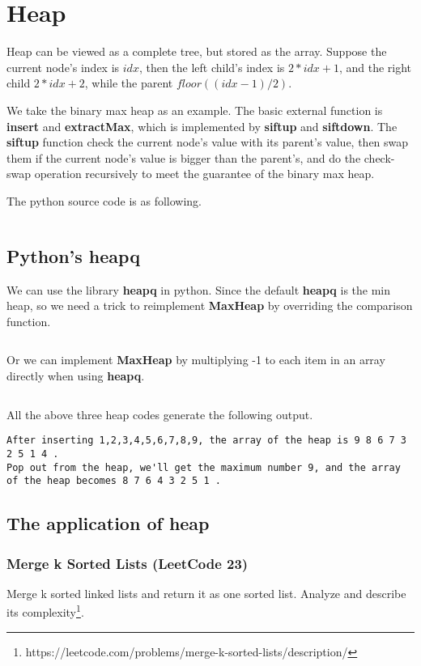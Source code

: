 \documentclass[11pt]{article}
\begin{document}
\inputminted{python}{src/maxSlidingWindow.py}

\section{Heap}
Heap can be viewed as a complete tree, but stored as the array. 
Suppose the current node's index is $idx$, then the left child's index is $2*idx+1$, and the right child $2*idx+2$, while the parent $floor((idx-1)/2)$.

We take the binary max heap as an example. 
The basic external function is \textbf{insert} and \textbf{extractMax}, which is implemented by \textbf{siftup} and \textbf{siftdown}. 
The \textbf{siftup} function check the current node's value with its parent's value, then swap them if the current node's value is bigger than the parent's, and do the check-swap operation recursively to meet the guarantee 
	of the binary max heap.
	
The python source code is as following.
\inputminted[breaklines=true,frame=leftline, linenos=true]{python}{src/heap.py}

\subsection{Python's heapq}
We can use the library \textbf{heapq} in python. 
Since the default \textbf{heapq} is the min heap, so we need a trick to reimplement \textbf{MaxHeap} by overriding the comparison function. 
\inputminted[breaklines=true,frame=leftline, linenos=true]{python}{src/heap_heapq.py}

Or we can implement \textbf{MaxHeap} by multiplying -1 to each item in an array directly when using \textbf{heapq}.

\inputminted[breaklines=true,frame=leftline, linenos=true]{python}{src/heap_heapq2.py}

All the above three heap codes generate the following output. 
\begin{verbatim}
After inserting 1,2,3,4,5,6,7,8,9, the array of the heap is 9 8 6 7 3 2 5 1 4 .
Pop out from the heap, we'll get the maximum number 9, and the array of the heap becomes 8 7 6 4 3 2 5 1 .
\end{verbatim}

\subsection{The application of heap}
\subsubsection{Merge k Sorted Lists (LeetCode 23)}
Merge k sorted linked lists and return it as one sorted list. Analyze and describe its complexity\footnote{https://leetcode.com/problems/merge-k-sorted-lists/description/}.
\end{document}
